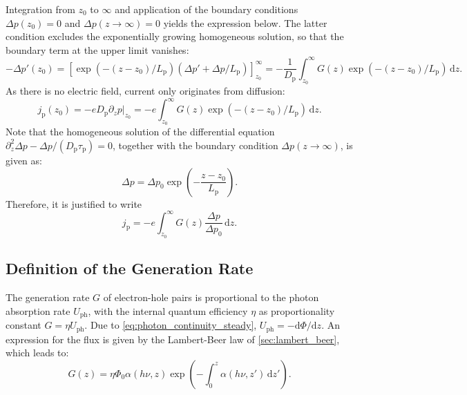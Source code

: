 Integration from $z_{0}$ to $\infty$ and application of the boundary conditions
$\Delta p(z_{0})=0$ and $\Delta p(z \to \infty)=0$ yields the expression below. The
latter condition excludes the exponentially growing homogeneous solution, so
that the boundary term at the upper limit vanishes:
\begin{equation}
	-\Delta p'(z_{0}) = \left[ \exp(-(z-z_{0})/L_{\mathrm{p}}) (\Delta
	p'+\Delta p/L_{\mathrm{p}}) \right]^{\infty}_{z_{0}}= -\frac{1}{D_{\mathrm{p}}}
	\int_{z_{0}}^{\infty}G(z) \exp(-(z-z_{0})/L_{\mathrm{p}}) \, \mathrm{d}z.
\end{equation}
As there is no electric field, current only originates from diffusion:
\begin{equation}
	j_{\mathrm{p}}(z_{0})= -eD_{\mathrm{p}}\partial_{z}p \big|_{z_{0}}= -e \int_{z_{0}}
	^{\infty}G(z) \exp(-(z-z_{0})/L_{\mathrm{p}}) \, \mathrm{d}z. \label{eq:j_p_bulk}
\end{equation}
Note that the homogeneous solution of the differential equation $\partial_{z}^{2}
\Delta p-\Delta p/(D_{\mathrm{p}}\tau_{\mathrm{p}})=0$, together with the
boundary condition $\Delta p(z \to \infty)$, is given as:
\begin{equation}
	\Delta p=\Delta p_{0}\exp\left( -\frac{z-z_{0}}{L_{\mathrm{p}}} \right).
\end{equation}
Therefore, it is justified to write
\begin{equation}
	j_{\mathrm{p}}=-e \int_{z_{0}}^{\infty}G(z) \frac{\Delta p}{\Delta p_{0}}\, \mathrm{d}
	z.
\end{equation}

\subsection{Definition of the Generation Rate}
\label{subsec:generation_rate}

The generation rate $G$ of electron-hole pairs is proportional to the photon absorption
rate $U_{\mathrm{ph}}$, with the internal quantum efficiency $\eta$ as
proportionality constant $G=\eta U_{\mathrm{ph}}$. Due to \cref{eq:photon_continuity_steady},
$U_{\mathrm{ph}}=-\mathrm{d}\Phi/\mathrm{d}z$. An expression for the flux is given
by the Lambert-Beer law of \cref{sec:lambert_beer}, which leads to:
\begin{equation}
	G(z)=\eta \Phi_{0}\alpha(h\nu, z) \exp\left( -\int_{0}^{z}\alpha(h \nu, z') \, \mathrm{d}
	z' \right). \label{eq:generation_rate}
\end{equation}

